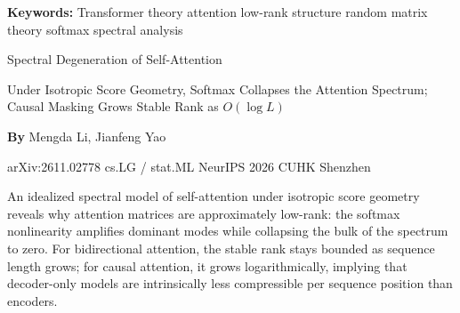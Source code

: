 \documentclass[10pt,twocolumn]{article}
\begin{document}
\setlength{\parindent}{0pt}
\setlength{\parskip}{4pt}

{\small\color{keywordgray}\textbf{Keywords:}
  Transformer theory \textbullet{}
  attention low-rank structure \textbullet{}
  random matrix theory \textbullet{}
  softmax spectral analysis}\par\vspace{4pt}

{\LARGE\bfseries\raggedright
  Spectral Degeneration of Self-Attention}\par\vspace{4pt}

{\large\itshape\raggedright
  Under Isotropic Score Geometry, Softmax Collapses the Attention
  Spectrum; Causal Masking Grows Stable Rank as $O(\log L)$}\par\vspace{6pt}

{\small\textbf{By} Mengda Li, Jianfeng Yao}\par\vspace{2pt}

{\small\color{keywordgray}arXiv:2611.02778 \textbullet{}
  cs.LG / stat.ML \textbullet{} NeurIPS 2026 \textbullet{}
  CUHK Shenzhen}
\par\vspace{2pt}\noindent{\color{rulered}\rule{\columnwidth}{0.6pt}}\vspace{6pt}

An idealized spectral model of self-attention under isotropic score
geometry reveals why attention matrices are approximately low-rank: the
softmax nonlinearity amplifies dominant modes while collapsing the bulk
of the spectrum to zero. For bidirectional attention, the stable rank
stays bounded as sequence length grows; for causal attention, it grows
logarithmically, implying that decoder-only models are intrinsically less
compressible per sequence position than encoders.
\end{document}
